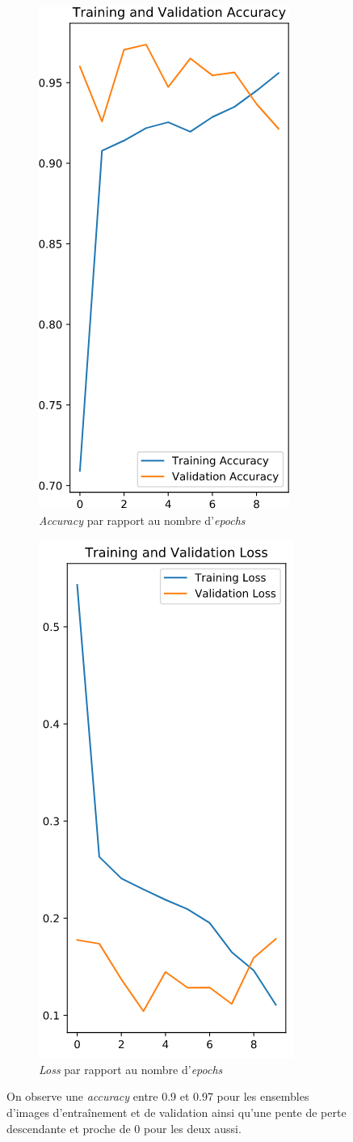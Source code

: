 \documentclass[french]{article}
\theoremstyle{mytheoremstyle}
\theoremstyle{mytheoremstyle}
\theoremstyle{myproblemstyle}
\begin{document}
    \begin{figure}[H]
    \centering
    \begin{subfigure}[t]{0.5\textwidth}
            \centering
            \includegraphics[width=0.4\linewidth]{images/cnn_acc_loss_1.png}
            \caption{\emph{Accuracy} par rapport au nombre d'\emph{epochs}}
    \end{subfigure}%
    \begin{subfigure}[t]{0.5\textwidth}
            \centering
            \includegraphics[width=0.4\linewidth]{images/cnn_acc_loss_2.png}
            \caption{\emph{Loss} par rapport au nombre d'\emph{epochs}}
    \end{subfigure}
    \caption{On observe une \emph{accuracy} entre 0.9 et 0.97 pour les ensembles d'images d'entraînement et de validation ainsi qu'une pente de perte descendante et proche de 0 pour les deux aussi.}
    \end{figure}
\end{document}
